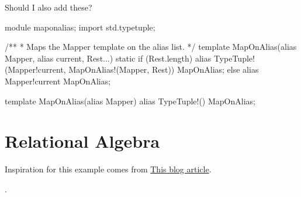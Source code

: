 Should I also add these?

\begin{dcode}
module maponalias;
import std.typetuple;

/**
 * Maps the Mapper template on the alias list.
 */
template MapOnAlias(alias Mapper, alias current, Rest...)
{
    static if (Rest.length)
        alias TypeTuple!(Mapper!current, MapOnAlias!(Mapper, Rest)) MapOnAlias;
    else
        alias Mapper!current MapOnAlias;
}

template MapOnAlias(alias Mapper)
{
    alias TypeTuple!() MapOnAlias;
}
\end{dcode}

\section{Relational Algebra}\label{relationalalgebra}

Inspiration for this example comes from \href{http://david.rothlis.net/d/templates}{This blog article}.

.


